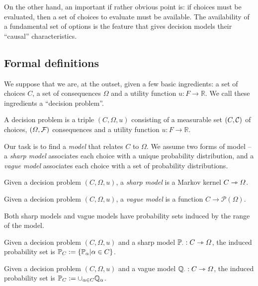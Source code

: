 On the other hand, an important if rather obvious point is: if choices must be evaluated, then a set of choices to evaluate must be available. The availability of a fundamental set of options is the feature that gives decision models their ``causal'' characteristics.

\subsection{Formal definitions}\label{sec:probability_sets}

We suppose that we are, at the outset, given a few basic ingredients: a set of choices $C$, a set of consequences $\Omega$ and a utility function $u:F\to \mathbb{R}$. We call these ingredients a ``decision problem''.

\begin{definition}
A decision problem is a triple $(C,\Omega,u)$ consisting of a measurable set $(C,\mathcal{C})$ of choices, $(\Omega,\mathcal{F})$ consequences and a utility function $u:F\to \mathbb{R}$.
\end{definition}

Our task is to find a \emph{model} that relates $C$ to $\Omega$. We assume two forms of model -- a \emph{sharp model} associates each choice with a unique probability distribution, and a \emph{vague model} associates each choice with a set of probability distributions.

\begin{definition}
Given a decision problem $(C,\Omega,u)$, a \emph{sharp model} is a Markov kernel $C\rightarrowtriangle \Omega$.
\end{definition}

\begin{definition}
Given a decision problem $(C,\Omega,u)$, a \emph{vague model} is a function $C\to \mathscr{P}(\Omega)$.
\end{definition}

Both sharp models and vague models have probability sets induced by the range of the model.

\begin{definition}
Given a decision problem $(C,\Omega,u)$ and a sharp model $\mathbb{P}_\cdot:C\rightarrowtriangle \Omega$, the induced probability set is $\mathbb{P}_C:=\{\mathbb{P}_\alpha|\alpha\in C\}$.
\end{definition}

\begin{definition}
Given a decision problem $(C,\Omega,u)$ and a vague model $\mathbb{Q}_\cdot:C\rightarrowtriangle \Omega$, the induced probability set is $\mathbb{P}_C:=\cup_{\alpha\in C} \mathbb{Q}_\alpha$.
\end{definition}

